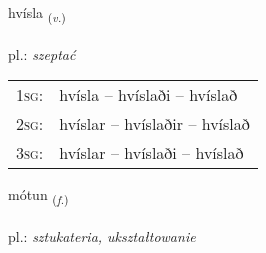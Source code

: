 \documentclass[frontgrid, backgrid]{flacards}\usepackage[]{graphicx}\usepackage[]{xcolor}
\begin{document}
\renewcommand{\blhead}{\vskip5pt {\small\bfseries\footnotesize Sagnorð | czasownik }}
\renewcommand{\bcfoot}{\vskip5pt \hspace{2pt}{\small\bfseries\footnotesize 3K}}


{hvísla \small{\textsubscript{(\textit{v.})}} \\[1ex] %
\textphonetic{[kʰvistla]} \\
pl.: \emph{szeptać} \\  [2ex]
\renewcommand*{\arraystretch}{0.8}
\begin{tabular}{p{1cm}l}
\textsc{1sg}: & hvísla -- hvíslaði -- hvíslað \\ 
\textsc{2sg}: & hvíslar -- hvíslaðir -- hvíslað \\ 
\textsc{3sg}: & hvíslar -- hvíslaði -- hvíslað \\ 
\end{tabular}
}

\renewcommand{\flhead}{\vskip5pt \fboxsep=0pt {\small\bfseries\footnotesize Nafnorð | rzeczownik}}
\renewcommand{\fcfoot}{\vskip5pt \fboxsep=0pt \hspace{2pt}{\small\bfseries\footnotesize 3K}}

\renewcommand{\blhead}{\vskip5pt {\small\bfseries\footnotesize Nafnorð | rzeczownik }}
\renewcommand{\bcfoot}{\vskip5pt \hspace{2pt}{\small\bfseries\footnotesize 3K}}


{mótun \small{\textsubscript{(\textit{f.})}} \\[1ex] %
\textphonetic{[mouːtʏn]} \\
pl.: \emph{sztukateria, ukształtowanie} \\  [2ex]
\renewcommand*{\arraystretch}{0.8}
}

\renewcommand{\flhead}{\vskip5pt \fboxsep=0pt {\small\bfseries\footnotesize Nafnorð | rzeczownik}}
\renewcommand{\fcfoot}{\vskip5pt \fboxsep=0pt \hspace{2pt}{\small\bfseries\footnotesize 3K}}
\end{document}
